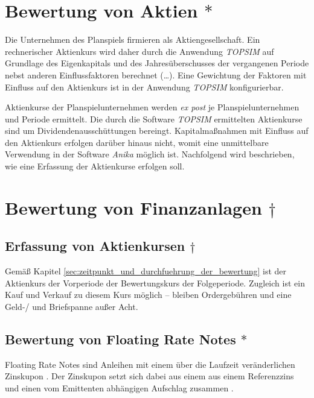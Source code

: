 \documentclass[12pt, a4paper]{article}
\begin{document}
\section{Bewertung von Aktien $\ast$}
\label{sec:bewertung_von_aktien}
Die Unternehmen des Planspiels firmieren als Aktiengesellschaft.
Ein rechnerischer Aktienkurs wird daher durch die Anwendung \textit{TOPSIM} auf Grundlage des Eigenkapitals und des Jahresüberschusses der vergangenen Periode nebst anderen Einflussfaktoren berechnet (\dots). 
Eine Gewichtung der Faktoren mit Einfluss auf den Aktienkurs ist in der Anwendung \textit{TOPSIM} konfigurierbar. 

Aktienkurse der Planspielunternehmen werden \textit{ex post} je Planspielunternehmen und Periode ermittelt. Die durch die Software \textit{TOPSIM} ermittelten Aktienkurse sind um Dividendenausschüttungen bereingt. Kapitalmaßnahmen mit Einfluss auf den Aktienkurs erfolgen darüber hinaus nicht, womit eine unmittelbare Verwendung in der Software \textit{Anika} möglich ist. Nachfolgend wird beschrieben, wie eine Erfassung der Aktienkurse erfolgen soll.

\section{Bewertung von Finanzanlagen $\dagger$}
\label{sec:bewertung_von_finanzanlagen}

\subsection{Erfassung von Aktienkursen $\dagger$}
\label{sec:erfassung_von_aktienkursen}

Gemäß Kapitel \ref{sec:zeitpunkt_und_durchfuehrung_der_bewertung} ist der Aktienkurs der Vorperiode der Bewertungskurs der Folgeperiode.
Zugleich ist ein Kauf und Verkauf zu diesem Kurs möglich -- bleiben Ordergebühren und eine Geld-/ und Briefspanne außer Acht. 


\subsection{Bewertung von Floating Rate Notes $\ast$}
\label{sec:bewertung_von_floating_rate_notes}
Floating Rate Notes sind Anleihen mit einem über die Laufzeit veränderlichen Zinskupon \autocite[][373]{fabozzi_handbook_2005}. Der Zinskupon setzt sich dabei aus einem aus einem Referenzzins und einen vom Emittenten abhängigen Aufschlag zusammen \autocite[][374]{fabozzi_handbook_2005}.
\end{document}
